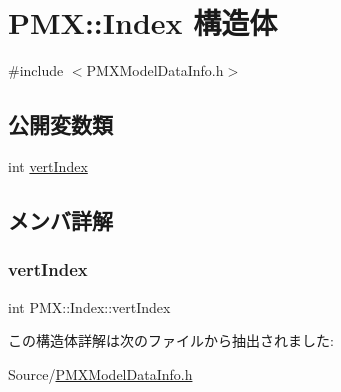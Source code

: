 \hypertarget{struct_p_m_x_1_1_index}{}\section{P\+MX\+:\+:Index 構造体}
\label{struct_p_m_x_1_1_index}


{\ttfamily \#include $<$P\+M\+X\+Model\+Data\+Info.\+h$>$}

\subsection*{公開変数類}
\begin{DoxyCompactItemize}
\item 
int \mbox{\hyperlink{struct_p_m_x_1_1_index_af3665ba24260c5756c30b734d97d1c74}{vert\+Index}}
\end{DoxyCompactItemize}


\subsection{メンバ詳解}
\mbox{\label{struct_p_m_x_1_1_index_af3665ba24260c5756c30b734d97d1c74}} 
\subsubsection{\texorpdfstring{vert\+Index}{vertIndex}}
{\footnotesize\ttfamily int P\+M\+X\+::\+Index\+::vert\+Index}



この構造体詳解は次のファイルから抽出されました\+:\begin{DoxyCompactItemize}
\item 
Source/\mbox{\hyperlink{_p_m_x_model_data_info_8h}{P\+M\+X\+Model\+Data\+Info.\+h}}\end{DoxyCompactItemize}
